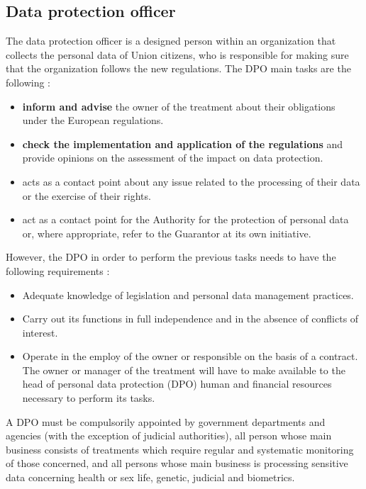\subsection{Data protection officer}
The data protection officer is a designed person within an organization that collects the personal data of Union citizens, who is responsible for making sure that the organization follows the new regulations. The DPO main tasks are the following :
\begin{itemize}
\item \textbf{inform and advise} the owner of the treatment about their obligations under the European regulations.
\item \textbf{check the implementation and application of the regulations} and provide opinions on the assessment of the impact on data protection.
\item acts as a contact point about any issue related to the processing of their data or the exercise of their rights.
\item act as a contact point for the Authority for the protection of personal data or, where appropriate, refer to the Guarantor at its own initiative.
\end{itemize}
However, the DPO in order to perform the previous tasks needs to have the following requirements :
\begin{itemize}
\item Adequate knowledge of legislation and personal data management practices.
\item Carry out its functions in full independence and in the absence of conflicts of interest.
\item Operate in the employ of the owner or responsible on the basis of a contract. The owner or manager of the treatment will have to make available to the head of personal data protection (DPO) human and financial resources necessary to perform its tasks.
\end{itemize}
A DPO must be compulsorily appointed by government departments and agencies (with the exception of judicial authorities), all person whose main business consists of treatments which require regular and systematic monitoring of those concerned, and all persons whose main business is processing sensitive data concerning health or sex life, genetic, judicial and biometrics.

